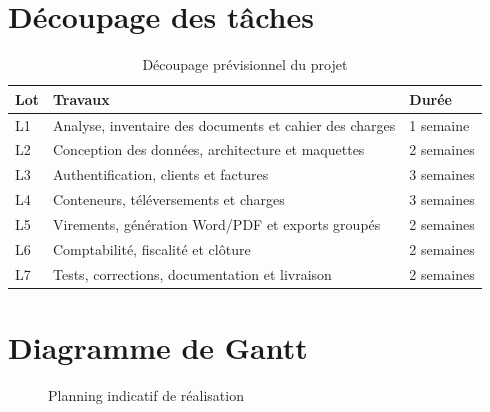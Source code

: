 \documentclass[12pt,a4paper,oneside]{report}
\begin{document}
\section{Découpage des tâches}
\begin{table}[H]\centering
\caption{Découpage prévisionnel du projet}
\begin{tabularx}{\textwidth}{p{1.2cm}Y p{2cm}}
\toprule \textbf{Lot} & \textbf{Travaux} & \textbf{Durée}\\ \midrule
L1 & Analyse, inventaire des documents et cahier des charges & 1 semaine\\
L2 & Conception des données, architecture et maquettes & 2 semaines\\
L3 & Authentification, clients et factures & 3 semaines\\
L4 & Conteneurs, téléversements et charges & 3 semaines\\
L5 & Virements, génération Word/PDF et exports groupés & 2 semaines\\
L6 & Comptabilité, fiscalité et clôture & 2 semaines\\
L7 & Tests, corrections, documentation et livraison & 2 semaines\\
\bottomrule
\end{tabularx}
\end{table}

\section{Diagramme de Gantt}
\begin{figure}[H]\centering
{}
\caption{Planning indicatif de réalisation}
\end{figure}
\end{document}
